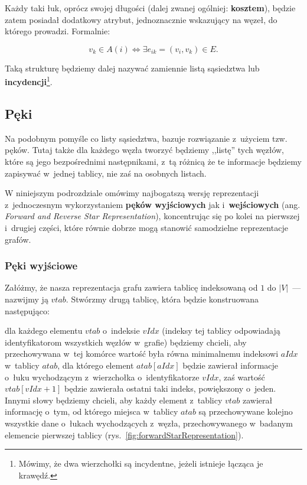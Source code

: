 Każdy taki łuk, oprócz swojej długości (dalej zwanej ogólniej: \textbf{kosztem}), będzie zatem posiadał dodatkowy atrybut, jednoznacznie wskazujący na węzeł, do którego prowadzi. Formalnie:

\begin{equation}
	v_{k} \in A \left ( i \right ) \Leftrightarrow \exists e_{ik} = \left( v_{i}, v_{k} \right) \in E\textrm{.}
\end{equation}

Taką strukturę będziemy dalej nazywać zamiennie listą sąsiedztwa lub \textbf{incydencji}\footnote{
	Mówimy, że dwa wierzchołki są incydentne, jeżeli istnieje łącząca je krawędź.
}.



\subsection{Pęki}



Na podobnym pomyśle co listy sąsiedztwa, bazuje rozwiązanie z~użyciem tzw. pęków.
Tutaj także dla każdego węzła tworzyć będziemy ,,listę'' tych węzłów, które są jego bezpośrednimi następnikami, z~tą różnicą że te informacje będziemy zapisywać w~jednej tablicy, nie zaś na osobnych listach.

W niniejszym podrozdziale omówimy najbogatszą wersję reprezentacji z~jednoczesnym wykorzystaniem \textbf{pęków wyjściowych} jak i~\textbf{wejściowych} (ang. \textit{Forward and Reverse Star Representation}), koncentrując się po kolei na pierwszej i~drugiej części, które równie dobrze mogą stanowić samodzielne reprezentacje grafów.


\subsubsection{Pęki wyjściowe}


Załóżmy, że nasza reprezentacja grafu zawiera tablicę indeksowaną od $1$ do $\left| V \right|$~--- nazwijmy ją $vtab$.
Stwórzmy drugą tablicę, która będzie konstruowana następująco:

\begin{myitemize}
	\item dla każdego elementu $vtab$ o~indeksie $vIdx$ (indeksy tej tablicy odpowiadają identyfikatorom wszystkich węzłów w~grafie) będziemy chcieli, aby przechowywana w~tej komórce wartość była równa minimalnemu indeksowi $aIdx$ w~tablicy $atab$, dla którego element $atab \left[ aIdx \right]$ będzie zawierał informacje o~łuku wychodzącym z~wierzchołka o~identyfikatorze $vIdx$, zaś wartość $vtab \left[ vIdx+1 \right]$ będzie zawierała ostatni taki indeks, powiększony o~jeden.
	Innymi słowy będziemy chcieli, aby każdy element z~tablicy $vtab$ zawierał informację o~tym, od którego miejsca w~tablicy $atab$ są przechowywane kolejno wszystkie dane o~łukach wychodzących z~węzła, przechowywanego w~badanym elemencie pierwszej tablicy (rys.~\ref{fig:forwardStarRepresentation}).
\end{myitemize}


